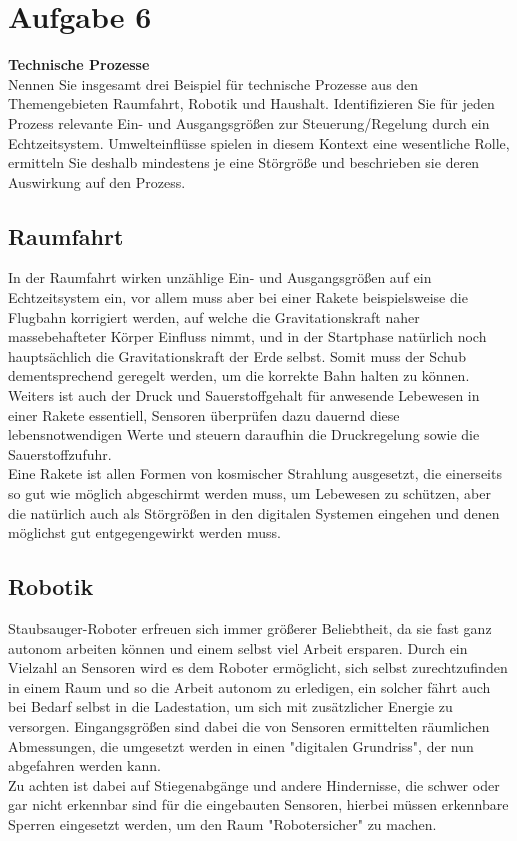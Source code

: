 \documentclass[12pt,a4paper,ngerman]{article}
\begin{document}
\section{Aufgabe 6}
\begin{framed}
\textbf{Technische Prozesse}\\
Nennen Sie insgesamt drei Beispiel für technische Prozesse aus den Themengebieten Raumfahrt, Robotik und Haushalt. Identifizieren Sie für jeden Prozess relevante Ein- und Ausgangsgrößen zur Steuerung/Regelung durch ein Echtzeitsystem. Umwelteinflüsse spielen in diesem Kontext eine wesentliche Rolle, ermitteln Sie deshalb mindestens je eine Störgröße und beschrieben sie deren Auswirkung auf den Prozess. 
\end{framed}

\subsection*{Raumfahrt}
In der Raumfahrt wirken unzählige Ein- und Ausgangsgrößen auf ein Echtzeitsystem ein, vor allem muss aber bei einer Rakete beispielsweise die Flugbahn korrigiert werden, auf welche die Gravitationskraft naher massebehafteter Körper Einfluss nimmt, und in der Startphase natürlich noch hauptsächlich die Gravitationskraft der Erde selbst. Somit muss der Schub dementsprechend geregelt werden, um die korrekte Bahn halten zu können. Weiters ist auch der Druck und Sauerstoffgehalt für anwesende Lebewesen in einer Rakete essentiell, Sensoren überprüfen dazu dauernd diese lebensnotwendigen Werte und steuern daraufhin die Druckregelung sowie die Sauerstoffzufuhr. \\
Eine Rakete ist allen Formen von kosmischer Strahlung ausgesetzt, die einerseits so gut wie möglich abgeschirmt werden muss, um Lebewesen zu schützen, aber die natürlich auch als Störgrößen in den digitalen Systemen eingehen und denen möglichst gut entgegengewirkt werden muss. 

\subsection*{Robotik}
Staubsauger-Roboter erfreuen sich immer größerer Beliebtheit, da sie fast ganz autonom arbeiten können und einem selbst viel Arbeit ersparen. Durch ein Vielzahl an Sensoren wird es dem Roboter ermöglicht, sich selbst zurechtzufinden in einem Raum und so die Arbeit autonom zu erledigen, ein solcher fährt auch bei Bedarf selbst in die Ladestation, um sich mit zusätzlicher Energie zu versorgen. Eingangsgrößen sind dabei die von Sensoren ermittelten räumlichen Abmessungen, die umgesetzt werden in einen "digitalen Grundriss", der nun abgefahren werden kann. 
\\
Zu achten ist dabei auf Stiegenabgänge und andere Hindernisse, die schwer oder gar nicht erkennbar sind für die eingebauten Sensoren, hierbei müssen erkennbare Sperren eingesetzt werden, um den Raum "Robotersicher" zu machen. 
\end{document}
